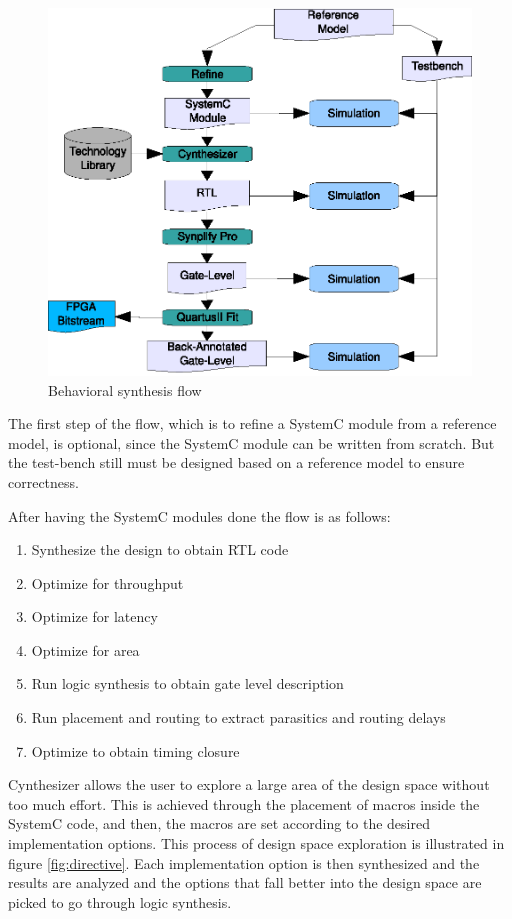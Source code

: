 \documentclass[a4paper, 12pt]{article}
\begin{document}
\begin{figure}[h]
\centering
\includegraphics{figs/flow.eps}
\caption{Behavioral synthesis flow}
\label{fig:flow}
\end{figure}

The first step of the flow, which is to refine a SystemC module from a reference model, is optional, since the SystemC module can be written from scratch. But the test-bench still must be designed based on a reference model to ensure correctness.

After having the SystemC modules done the flow is as follows:
\begin{enumerate}
\item Synthesize the design to obtain RTL code
\item Optimize for throughput
\item Optimize for latency
\item Optimize for area
\item Run logic synthesis to obtain gate level description
\item Run placement and routing to extract parasitics and routing delays
\item Optimize to obtain timing closure
\end{enumerate}

Cynthesizer allows the user to explore a large area of the design space without too much effort. This is achieved through the placement of macros inside the SystemC code, and then, the macros are set according to the desired implementation options. This process of design space exploration is illustrated in figure \ref{fig:directive}. Each implementation option is then synthesized and the results are analyzed and the options that fall better into the design space are picked to go through logic synthesis.
\end{document}
